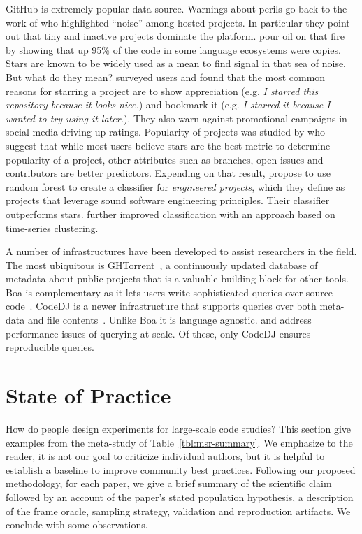 \documentclass[sigconf,review,anonymous]{acmart}
\newcommand{\gh}{{GitHub}\xspace}
\newcommand{\ght}{{GHTorrent}\xspace}
\renewcommand{\dj}{{\textsf{Code{\small{DJ}}}}\xspace}
\begin{document}
 \gh is extremely popular data source. Warnings
about perils go back to the work of \citet{Kalliamvakou:2014} who highlighted
``noise'' among hosted projects. In particular they point out that tiny and
inactive projects dominate the platform. \citet{oopsla17a} pour oil on that fire
by showing that up 95\% of the code in some language ecosystems were copies.
Stars are known to be widely used as a mean to find signal in that sea of noise.
But what do they mean? \citet{Borges:2018:JSS} surveyed users and found that the
most common reasons for starring a project are to show appreciation (e.g. {\it I
  starred this repository because it looks nice.}) and bookmark it (e.g. {\it I
  starred it because I wanted to try using it later.}). They also warn against
promotional campaigns in social media driving up ratings. Popularity of projects
was studied by \citet{Han:2019:COMPSAC} who suggest that while most users
believe stars are the best metric to determine popularity of a project, other
attributes such as branches, open issues and contributors are better predictors.
Expending on that result, \citet{mun17} propose to use random forest to create
a classifier for \emph{engineered projects}, which they define as projects that
leverage sound software engineering principles. Their classifier outperforms
stars. \citet{pick19} further improved classification with an approach based on
time-series clustering.

 A number of infrastructures have been developed to
assist researchers in the field. The most ubiquitous is
\ght~\cite{Gousios:2012}, a continuously updated database of metadata about
public projects that is a valuable building block for other tools. Boa is
complementary as it lets users write sophisticated queries over source
code~\cite{Boa:2013}. \dj is a newer infrastructure that supports queries over
both meta-data and file contents~\cite{ecoop21}. Unlike Boa it is language
agnostic. \citet{ma21} and \citet{Mattis:2020:ACM} address performance issues of
querying at scale. Of these, only \dj ensures reproducible queries.

\section{State of Practice}

How do people design experiments for large-scale code studies? This section give
examples from the meta-study of Table~\ref{tbl:msr-summary}. We emphasize to the
reader, it is not our goal to criticize individual authors, but it is helpful to
establish a baseline to improve community best practices. Following our proposed
methodology, for each paper, we give a brief summary of the scientific claim
followed by an account of the paper's stated population hypothesis, a
description of the frame oracle, sampling strategy, validation and reproduction
artifacts. We conclude with some observations.
\end{document}
